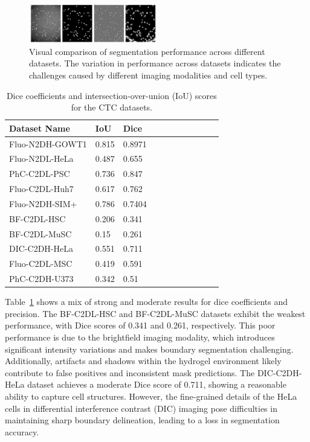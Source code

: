 \documentclass[./dissertation.tex]{subfiles}
\begin{document}
\begin{figure}
    \includegraphics[width=0.5\textwidth]{./figures/cc/PhC-C2DL-PSC.png}
    \caption{Visual comparison of segmentation performance across different datasets. The variation in performance across datasets indicates the challenges caused by different imaging modalities and cell types.} \label{fig2}
\end{figure}


\begin{table}
    \caption{Dice coefficients and intersection-over-union (IoU) scores for the CTC datasets.}
    \centering
    \label{tbl:iou_dice}
    \begin{tabular}{|l|l|l|l|l|l|l|l|l|l|l|}
        \hline
        \textbf{Dataset Name} & \textbf{IoU} & \textbf{Dice} \\ \hline
        Fluo-N2DH-GOWT1       & 0.815        & 0.8971        \\ \hline
        Fluo-N2DL-HeLa        & 0.487        & 0.655         \\ \hline
        PhC-C2DL-PSC          & 0.736        & 0.847         \\ \hline
        Fluo-C2DL-Huh7        & 0.617        & 0.762         \\ \hline
        Fluo-N2DH-SIM+        & 0.786        & 0.7404        \\ \hline
        BF-C2DL-HSC           & 0.206        & 0.341         \\ \hline
        BF-C2DL-MuSC          & 0.15         & 0.261         \\ \hline
        DIC-C2DH-HeLa         & 0.551        & 0.711         \\ \hline
        Fluo-C2DL-MSC         & 0.419        & 0.591         \\ \hline
        PhC-C2DH-U373         & 0.342        & 0.51          \\ \hline
    \end{tabular}
\end{table}

Table~\ref{tbl:iou_dice} shows a mix of strong and moderate results for dice coefficients and precision. The BF-C2DL-HSC and BF-C2DL-MuSC datasets exhibit the weakest performance, with Dice scores of 0.341 and 0.261, respectively. This poor performance is due to the brightfield imaging modality, which introduces significant intensity variations and makes boundary segmentation challenging. Additionally, artifacts and shadows within the hydrogel environment likely contribute to false positives and inconsistent mask predictions. The DIC-C2DH-HeLa dataset achieves a moderate Dice score of 0.711, showing a reasonable ability to capture cell structures. However, the fine-grained details of the HeLa cells in differential interference contrast (DIC) imaging pose difficulties in maintaining sharp boundary delineation, leading to a loss in segmentation accuracy.
\end{document}
